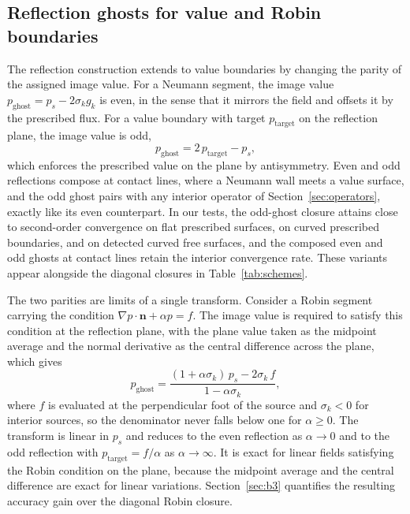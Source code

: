 \documentclass[preprint,review,12pt]{elsarticle}
\begin{document}
\subsection{Reflection ghosts for value and Robin boundaries}
\label{sec:oddghost}

The reflection construction extends to value boundaries by changing the parity of the assigned image value.
For a Neumann segment, the image value $p_{\mathrm{ghost}}=p_s-2\sigma_k g_k$ is even, in the sense that it mirrors the field and offsets it by the prescribed flux.
For a value boundary with target $p_{\mathrm{target}}$ on the reflection plane, the image value is odd,
\begin{equation}
  p_{\mathrm{ghost}}=2\,p_{\mathrm{target}}-p_s,
  \label{eq:oddghost}
\end{equation}
which enforces the prescribed value on the plane by antisymmetry.
Even and odd reflections compose at contact lines, where a Neumann wall meets a value surface, and the odd ghost pairs with any interior operator of Section~\ref{sec:operators}, exactly like its even counterpart.
In our tests, the odd-ghost closure attains close to second-order convergence on flat prescribed surfaces, on curved prescribed boundaries, and on detected curved free surfaces, and the composed even and odd ghosts at contact lines retain the interior convergence rate.
These variants appear alongside the diagonal closures in Table~\ref{tab:schemes}.

The two parities are limits of a single transform.
Consider a Robin segment carrying the condition $\nabla p\cdot\mathbf n+\alpha p=f$.
The image value is required to satisfy this condition at the reflection plane, with the plane value taken as the midpoint average and the normal derivative as the central difference across the plane, which gives
\begin{equation}
  p_{\mathrm{ghost}}=\frac{(1+\alpha\sigma_k)\,p_s-2\sigma_k\,f}{1-\alpha\sigma_k},
  \label{eq:robinghost}
\end{equation}
where $f$ is evaluated at the perpendicular foot of the source and $\sigma_k<0$ for interior sources, so the denominator never falls below one for $\alpha\ge0$.
The transform is linear in $p_s$ and reduces to the even reflection as $\alpha\to0$ and to the odd reflection with $p_{\mathrm{target}}=f/\alpha$ as $\alpha\to\infty$.
It is exact for linear fields satisfying the Robin condition on the plane, because the midpoint average and the central difference are exact for linear variations.
Section~\ref{sec:b3} quantifies the resulting accuracy gain over the diagonal Robin closure.
\end{document}
